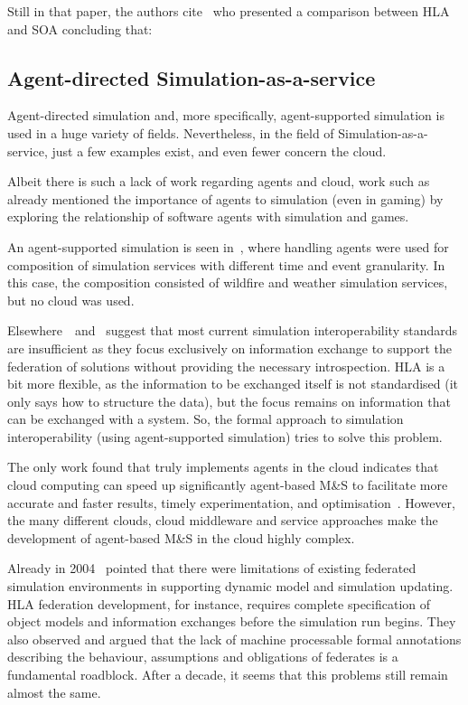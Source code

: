 \documentclass[conference]{IEEEtran}
\begin{document}
Still in that paper, the authors cite~\cite{Wang:2008:SHL:2367656.2367672} who presented a comparison between HLA and SOA concluding that:


\subsection{Agent-directed Simulation-as-a-service}
Agent-directed simulation and, more specifically, agent-supported simulation is used in a huge variety of fields. Nevertheless, in the field of Simulation-as-a-service, just a few examples exist, and even fewer concern the cloud.

Albeit there is such a lack of work regarding agents and cloud, work such as~\cite{Yilmaz01092006} already mentioned the importance of agents to simulation (even in gaming) by exploring the relationship of software agents with simulation and games.

An agent-supported simulation is seen in~\cite{Guo:2012:TGE:2346616.2346654}, where handling agents were used for composition of simulation services with different time and event granularity. In this case, the composition consisted of wildfire and weather simulation services, but no cloud was used.

Elsewhere~\cite{Tolk:2010:UFA:2433508.2433550}~and~\cite{Tolk:2011:MTI:2431518.2431551} suggest that most current simulation interoperability standards are insufficient as they focus exclusively on information exchange to support the federation of solutions without providing the necessary introspection. HLA is a bit more flexible, as the information to be exchanged itself is not standardised (it only says how to structure the data), but the focus remains on information that can be exchanged with a system. So, the formal approach to simulation interoperability (using agent-supported simulation) tries to solve this problem.

The only work found that truly implements agents in the cloud indicates that cloud computing can speed up significantly agent-based M\&S to facilitate more accurate and faster results, timely experimentation, and optimisation~\cite{Taylor:2014:TCC:2693848.2693884}. However, the many different clouds, cloud middleware and service approaches make the development of agent-based M\&S in the cloud highly complex.

Already in 2004~\cite{Yilmaz01092006} pointed that there were limitations of existing federated simulation environments in supporting dynamic model and simulation updating. HLA federation development, for instance, requires complete specification of object models and information exchanges before the simulation run begins. They also observed and argued that the lack of machine processable formal annotations describing the behaviour, assumptions and obligations of federates is a fundamental roadblock. After a decade, it seems that this problems still remain almost the same.
\end{document}
